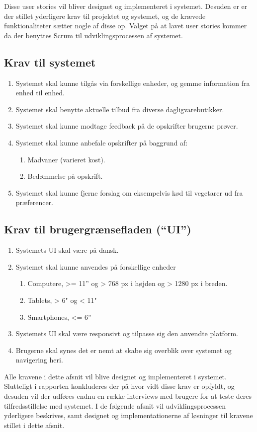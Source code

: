 Disse user stories vil bliver designet og implementeret i systemet.
Desuden er er der stillet yderligere krav til projektet og systemet, og de krævede funktionaliteter sætter nogle af disse op.
Valget på at lavet user stories kommer da der benyttes Scrum til udviklingsprocessen af systemet.

\subsection{Krav til systemet}
\begin{enumerate}
\item Systemet skal kunne tilgås via forskellige enheder, og gemme information fra enhed til enhed.
\item Systemet skal benytte aktuelle tilbud fra diverse dagligvarebutikker.
\item Systemet skal kunne modtage feedback på de opskrifter brugerne prøver.
\item Systemet skal kunne anbefale opskrifter på baggrund af:
\begin{enumerate}
	\item Madvaner (varieret kost).
	\item Bedømmelse på opskrift.
\end{enumerate}
\item Systemet skal kunne fjerne forslag om eksempelvis kød til vegetarer ud fra præferencer.
\end{enumerate}

\subsection{Krav til brugergrænsefladen (“UI”)}
\begin{enumerate}
	\item Systemets UI skal være på dansk.
	\item Systemet skal kunne anvendes på forskellige enheder
	\begin{enumerate}
		\item Computere, >= 11” og > 768 px i højden og > 1280 px i breden.
		\item Tablets, > 6" og < 11"
		\item Smartphones, <= 6”
	\end{enumerate}
	\item Systemets UI skal være responsivt og tilpasse sig den anvendte platform.
	\item Brugerne skal synes det er nemt at skabe sig overblik over systemet og navigering heri.
\end{enumerate}

Alle kravene i dette afsnit vil blive designet og implementeret i systemet.
Slutteligt i rapporten konkluderes der på hvor vidt disse krav er opfyldt, og desuden vil der udføres endnu en række interviews med brugere for at teste deres tilfredsstillelse med systemet. 
I de følgende afsnit vil udviklingsprocessen yderligere beskrives, samt designet og implementationerne af løsninger til kravene stillet i dette afsnit.


